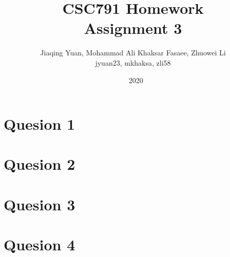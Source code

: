 \documentclass{article}
\title{CSC791 Homework\\ Assignment 3}
\author{Jiaqing Yuan, Mohammad Ali Khaksar Fasaee, Zhuowei Li\\ jyuan23, mkhaksa, zli58}
\date{~ 2020}
\begin{document}
\maketitle

\section{Quesion 1}

\section{Quesion 2}

\section{Quesion 3}

\section{Quesion 4}




\end{document}
